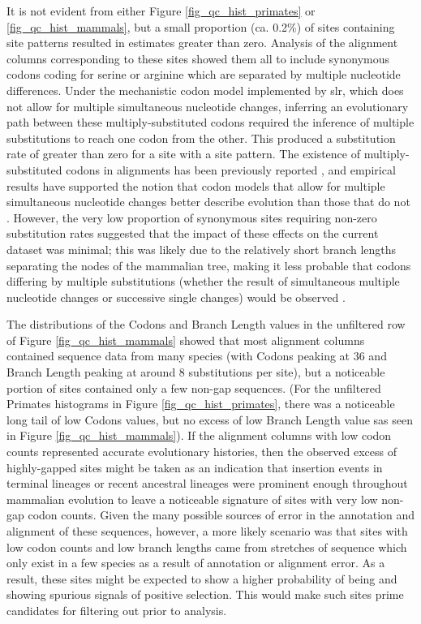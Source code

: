 It is not evident from either Figure \ref{fig_qc_hist_primates} or
\ref{fig_qc_hist_mammals}, but a small proportion (ca. 0.2\%) of sites
containing \syn site patterns resulted in \omgml estimates greater
than zero. Analysis of the alignment columns corresponding to these
sites showed them all to include synonymous codons coding for serine
or arginine which are separated by multiple nucleotide
differences. Under the mechanistic codon model implemented by
\ac{slr}, which does not allow for multiple simultaneous nucleotide
changes, inferring an evolutionary path between these
multiply-substituted codons required the inference of multiple \nsyn
substitutions to reach one codon from the other. This produced a \nsyn
substitution rate of greater than zero for a site with a \syn site
pattern. The existence of multiply-substituted codons in alignments
has been previously reported \citep{Averof2000,Whelan2004}, and
empirical results have supported the notion that codon models that
allow for multiple simultaneous nucleotide changes better describe
evolution than those that do not \citep{Kosiol2007}. However, the very
low proportion of synonymous sites requiring non-zero \nsyn
substitution rates suggested that the impact of these effects on the
current dataset was minimal; this was likely due to the relatively
short branch lengths separating the nodes of the mammalian tree,
making it less probable that codons differing by multiple
substitutions (whether the result of simultaneous multiple nucleotide
changes or successive single changes) would be observed
\citep{Kosiol2007}.

The distributions of the \Ngap Codons and \Ngap Branch Length values
in the unfiltered row of Figure \ref{fig_qc_hist_mammals} showed that
most alignment columns contained sequence data from many species (with
\Ngap Codons peaking at 36 and \Ngap Branch Length peaking at around 8
substitutions per site), but a noticeable portion of sites contained
only a few non-gap sequences. (For the unfiltered Primates histograms
in Figure \ref{fig_qc_hist_primates}, there was a noticeable long tail
of low \Ngap Codons values, but no excess of low \Ngap Branch Length
value sas seen in Figure \ref{fig_qc_hist_mammals}).  If the alignment
columns with low \ngap codon counts represented accurate evolutionary
histories, then the observed excess of highly-gapped sites might be
taken as an indication that insertion events in terminal lineages or
recent ancestral lineages were prominent enough throughout mammalian
evolution to leave a noticeable signature of sites with very low
non-gap codon counts. Given the many possible sources of error in the
annotation and alignment of these sequences, however, a more likely
scenario was that sites with low codon counts and low branch lengths
came from stretches of sequence which only exist in a few species as a
result of annotation or alignment error. As a result, these sites
might be expected to show a higher probability of being \nhom and
showing spurious signals of positive selection. This would make such
sites prime candidates for filtering out prior to analysis.

